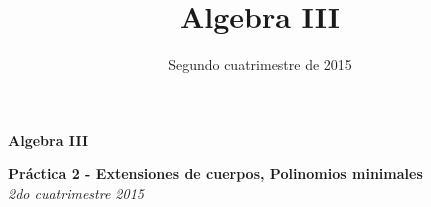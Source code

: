 \documentclass[10pt,a4paper]{article}
\date{Segundo cuatrimestre de 2015}
\title{Algebra III}
\begin{document}
\begin{center}
\begin{Large}\textbf{Algebra III}\end{Large}

\textbf{Pr\'actica 2 - Extensiones de cuerpos, Polinomios minimales}\\ {\em 2do cuatrimestre  2015}
\end{center}

\bigskip
\end{document}
